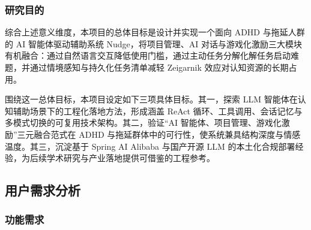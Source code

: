 \subsubsection{研究目的}

\par 综合上述意义维度，本项目的总体目标是设计并实现一个面向 ADHD 与拖延人群的 AI 智能体驱动辅助系统 Nudge，将项目管理、AI 对话与游戏化激励三大模块有机融合：通过自然语言交互降低使用门槛，通过主动任务分解化解任务启动难题，并通过情境感知与持久化任务清单减轻 Zeigarnik 效应对认知资源的长期占用。

\par 围绕这一总体目标，本项目设定如下三项具体目标。其一，探索 LLM 智能体在认知辅助场景下的工程化落地方法，形成涵盖 ReAct 循环、工具调用、会话记忆与多模式切换的可复用技术架构。其二，验证``AI 智能体、项目管理、游戏化激励''三元融合范式在 ADHD 与拖延群体中的可行性，使系统兼具结构深度与情感温度。其三，沉淀基于 Spring AI Alibaba 与国产开源 LLM 的本土化合规部署经验，为后续学术研究与产业落地提供可借鉴的工程参考。

\subsection{用户需求分析}


\subsubsection{功能需求}

